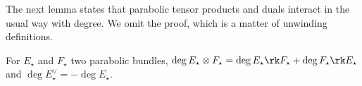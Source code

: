 The next lemma states that parabolic tensor products and duals interact in the usual way with degree.
We omit the proof, which is a matter of unwinding definitions.
\begin{lemma}
\notready
	\label{lemma:degree-in-duals}
	For $E_\star$ and $F_\star$ two parabolic bundles, $\deg E_\star \otimes
	F_\star= \deg E_\star \rk F_\star + \deg F_\star \rk E_\star$ and $\deg
	E_\star^\vee = - \deg E_\star$.
\end{lemma}
%



